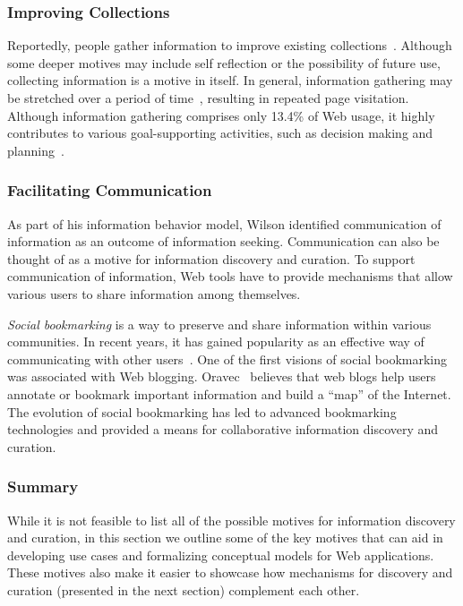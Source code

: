 \documentclass{sigchi}
\begin{document}
{{\subsubsection{Improving Collections}
Reportedly, people gather information to improve existing collections~\cite{lindley2012s}. Although some deeper motives may include self reflection or the possibility of future use, collecting information is a motive in itself. In general, information gathering may be stretched over a period of time~\cite{kellar2006goal}, resulting in repeated page visitation. Although information gathering comprises only 13.4\% of Web usage, it highly contributes to various goal-supporting activities, such as decision making and planning~\cite{kellar2006goal}.

}

{\subsubsection{Facilitating Communication}
As part of his information behavior model, Wilson identified communication of information as an outcome of information seeking. Communication can also be thought of as a motive for information discovery and curation. To support communication of information, Web tools have to provide mechanisms that allow various users to share information among themselves. 

\textit{Social bookmarking} is a way to preserve and share information within various communities. In recent years, it has gained popularity as an effective way of communicating with other users~\cite{estelles2010social}. One of the first visions of social bookmarking was associated with Web blogging. Oravec~\cite{oravec2002bookmarking} believes that web blogs help users annotate or bookmark important information and build a ``map'' of the Internet. The evolution of social bookmarking has led to advanced bookmarking technologies and provided a means for collaborative information discovery and curation. 
}
{\subsubsection{Summary}
While it is not feasible to list all of the possible motives for information discovery and curation, in this section we outline some of the key motives that can aid in developing use cases and formalizing conceptual models for Web applications. These motives also make it easier to showcase how mechanisms for discovery and curation (presented in the next section) complement each other.
} 
}
\end{document}
